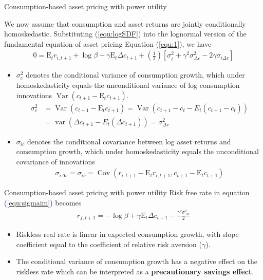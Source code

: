 \documentclass{beamer}
\begin{document}
\begin{frame}{Consumption-based asset pricing with power utility}

We now assume that consumption and asset returns are jointly conditionally \alert{homoskedastic}. Substituting (\textcolor{blue}{\ref{equ:logSDF}}) into the lognormal version of the fundamental equation of asset pricing Equation (\textcolor{blue}{\ref{equ:1}}), we have
	\begin{align}
		0=\mathrm{E}_{t} r_{i, t+1}+\log \beta-\gamma \mathrm{E}_{t} \Delta c_{t+1}+\left(\frac{1}{2}\right)\left[\sigma_{i}^{2}+\gamma^{2} \sigma_{\Delta c}^{2}-2 \gamma \sigma_{i \Delta c}\right]
	\end{align}
\begin{itemize}
	\item $   \sigma_{c}^2 $ denotes the conditional variance of consumption
	growth, which under homoskedasticity equals the unconditional variance of log consumption innovations $\operatorname{Var}\left(c_{t+1}-\mathrm{E}_{t} c_{t+1}\right)  $.
	\begin{align*}
	\sigma_{c}^2 &= \operatorname{Var}\left(c_{t+1}-\mathrm{E}_{t} c_{t+1}\right) = \operatorname{Var}\left(c_{t+1}-c_t-E_t\left(c_{t+1}-c_t\right)\right)\\
 & =\operatorname{var}\left(\Delta c_{t+1}-E_t\left(\Delta c_{t+1}\right)\right)  =\sigma_{\Delta c}^2 
	\end{align*}

	\item $ \sigma_{ic} $ denotes the conditional covariance between log asset returns and consumption growth, which under homoskedasticity equals the unconditional covariance of innovations
	\begin{align*}
		 \sigma_{i \Delta c}  = \sigma_{ic} =   \operatorname{Cov}\left(r_{i, t+1}-\mathrm{E}_{t} r_{i, t+1}, c_{t+1}-\mathrm{E}_{t} c_{t+1}\right)
	\end{align*}
\end{itemize}
\end{frame}

\begin{frame}{Consumption-based asset pricing with power utility}
		Risk free rate in equation \textcolor{blue}{(\ref{equ:sigmaim})} becomes
	\begin{align}\label{equ:rf}
		r_{f, t+1}=-\log \beta+\gamma \mathrm{E}_{t} \Delta c_{t+1}-\frac{\gamma^{2} \sigma_{\Delta c}^{2}}{2}
	\end{align}
	\begin{itemize}
		\item Riskless real rate is \alert{linear} in expected consumption growth, with slope coefficient equal to the \alert{coefficient of relative risk aversion} ($\gamma$).
		\item The conditional variance of consumption growth has a \alert{negative} effect on the riskless rate which can be interpreted as a \textbf{precautionary savings effect}.
	\end{itemize}
\end{frame}
\end{document}
